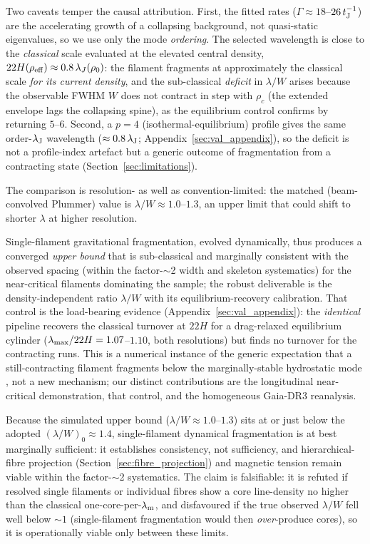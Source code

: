 \documentclass[usenatbib,twoside,twocolumn]{mnras}
\begin{document}
Two caveats temper the causal attribution. First, the fitted rates ($\Gamma\approx18$--$26\,t_{\rm J}^{-1}$) are the accelerating growth of a collapsing background, not quasi-static eigenvalues, so we use only the mode \emph{ordering}. The selected wavelength is close to the \emph{classical} scale evaluated at the elevated central density, $22H(\rho_{\rm eff})\approx0.8\,\lambda_J(\rho_0)$: the filament fragments at approximately the classical scale \emph{for its current density}, and the sub-classical \emph{deficit} in $\lambda/W$ arises because the observable FWHM $W$ does not contract in step with $\rho_c$ (the extended envelope lags the collapsing spine), as the equilibrium control confirms by returning $5$--$6$. Second, a $p=4$ (isothermal-equilibrium) profile gives the same order-$\lambda_{\rm J}$ wavelength ($\approx0.8\,\lambda_{\rm J}$; Appendix~\ref{sec:val_appendix}), so the deficit is not a profile-index artefact but a generic outcome of fragmentation from a contracting state (Section~\ref{sec:limitations}).

The comparison is resolution- as well as convention-limited: the matched (beam-convolved Plummer) value is $\lambda/W\approx1.0$--$1.3$, an upper limit that could shift to shorter $\lambda$ at higher resolution.

Single-filament gravitational fragmentation, evolved dynamically, thus produces a converged \emph{upper bound} that is sub-classical and marginally consistent with the observed spacing (within the factor-$\sim$2 width and skeleton systematics) for the near-critical filaments dominating the sample; the robust deliverable is the density-independent ratio $\lambda/W$ with its equilibrium-recovery calibration. That control is the load-bearing evidence (Appendix~\ref{sec:val_appendix}): the \emph{identical} pipeline recovers the classical turnover at $22H$ for a drag-relaxed equilibrium cylinder ($\lambda_{\rm max}/22H=1.07$--$1.10$, both resolutions) but finds no turnover for the contracting runs. This is a numerical instance of the generic expectation that a still-contracting filament fragments below the marginally-stable hydrostatic mode \citep{Clarke2016,Clarke2017,Clarke2020}, not a new mechanism; our distinct contributions are the longitudinal near-critical demonstration, that control, and the homogeneous Gaia-DR3 reanalysis.

Because the simulated upper bound ($\lambda/W\approx1.0$--$1.3$) sits at or just below the adopted $(\lambda/W)_0\approx1.4$, single-filament dynamical fragmentation is at best marginally sufficient: it establishes consistency, not sufficiency, and hierarchical-fibre projection (Section~\ref{sec:fibre_projection}) and magnetic tension remain viable within the factor-$\sim$2 systematics. The claim is falsifiable: it is refuted if resolved single filaments or individual fibres show a core line-density no higher than the classical one-core-per-$\lambda_{\rm m}$, and disfavoured if the true observed $\lambda/W$ fell well below $\sim1$ (single-filament fragmentation would then \emph{over}-produce cores), so it is operationally viable only between these limits.
\end{document}
